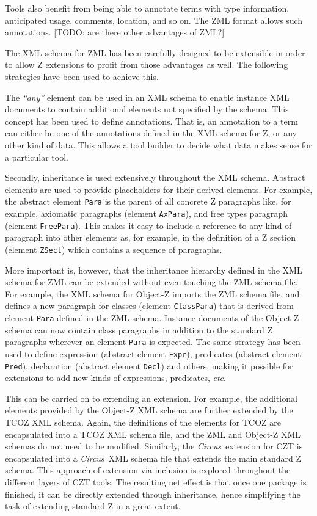 \documentclass{llncs}
\newcommand{\Circus}{{\sf\slshape Circus}}
\newcommand{\Element}[1]{\texttt{#1}}
\begin{document}
  Tools also benefit from being able to annotate terms with type
  information, anticipated usage, comments, location, and so on.
  The ZML format allows such annotations. 
  [TODO: are there other advantages of ZML?]

  The XML schema for ZML has been carefully designed to be extensible
  in order to allow Z extensions to profit from those advantages as well.
  The following strategies have been used to achieve this.

  The \textit{``any''} element can be used in an XML schema to enable
  instance XML documents to contain additional elements not specified
  by the schema.  This concept has been used to define annotations.
  That is, an annotation to a term can either be one of the
  annotations defined in the XML schema for Z, or any other kind of
  data.  This allows a tool builder to decide what data makes sense
  for a particular tool.

  Secondly, inheritance is used extensively throughout the XML schema.
  Abstract elements are used to provide placeholders for their derived
  elements.  For example, the abstract element \Element{Para} is the
  parent of all concrete Z paragraphs like, for example, axiomatic
  paragraphs (element \Element{AxPara}), and free types paragraph
  (element \Element{FreePara}).  This makes it easy to include a
  reference to any kind of paragraph into other elements as, for
  example, in the definition of a Z section (element \Element{ZSect})
  which contains a sequence of paragraphs.

  More important is, however, that the inheritance hierarchy defined
  in the XML schema for ZML can be extended without even touching the
  ZML schema file.  For example, the XML schema for Object-Z imports
  the ZML schema file, and defines a new paragraph for classes (element
  \Element{ClassPara}) that is derived from element \Element{Para}
  defined in the ZML schema.  Instance documents of the Object-Z
  schema can now contain class paragraphs in addition to the standard Z
  paragraphs wherever an element \Element{Para} is expected.  The same strategy has
  been used to define expression (abstract element \Element{Expr}),
  predicates (abstract element \Element{Pred}), declaration (abstract
  element \Element{Decl}) and others, making it possible for
  extensions to add new kinds of expressions, predicates, \textit{etc}.

  This can be carried on to extending an extension.  For example, the
  additional elements provided by the Object-Z XML schema are further
  extended by the TCOZ XML schema.  Again, the definitions of the elements
  for TCOZ are encapsulated into a TCOZ XML schema file, and the ZML and
  Object-Z XML schemas do not need to be modified.
  Similarly, the \Circus\ extension for CZT is encapsulated into a
  \Circus\ XML schema file that extends the main standard Z schema.
  This approach of extension via inclusion is explored throughout the
  different layers of CZT tools.
  The resulting net effect is that once one package is finished, it
  can be directly extended through inheritance, hence simplifying the
  task of extending standard Z in a great extent.
\end{document}
